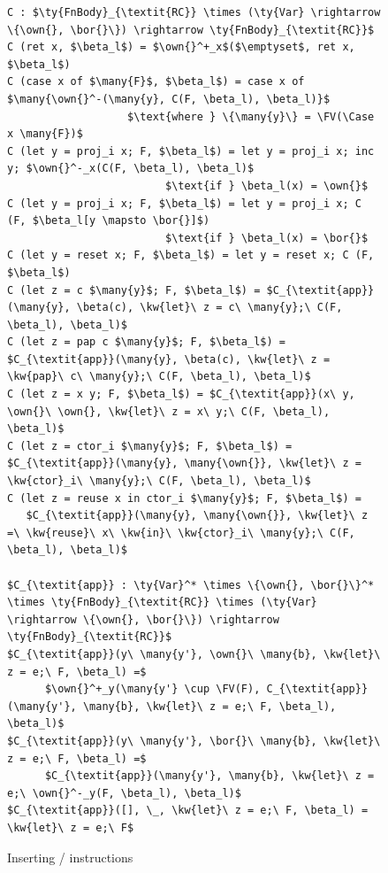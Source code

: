 \documentclass[sigconf]{acmart}
\begin{document}
\begin{figure}
\begin{lstlisting}
C : $\ty{FnBody}_{\textit{RC}} \times (\ty{Var} \rightarrow \{\own{}, \bor{}\}) \rightarrow \ty{FnBody}_{\textit{RC}}$
C (ret x, $\beta_l$) = $\own{}^+_x$($\emptyset$, ret x, $\beta_l$)
C (case x of $\many{F}$, $\beta_l$) = case x of $\many{\own{}^-(\many{y}, C(F, \beta_l), \beta_l)}$
                   $\text{where } \{\many{y}\} = \FV(\Case x \many{F})$
C (let y = proj_i x; F, $\beta_l$) = let y = proj_i x; inc y; $\own{}^-_x(C(F, \beta_l), \beta_l)$
                         $\text{if } \beta_l(x) = \own{}$
C (let y = proj_i x; F, $\beta_l$) = let y = proj_i x; C (F, $\beta_l[y \mapsto \bor{}]$)
                         $\text{if } \beta_l(x) = \bor{}$
C (let y = reset x; F, $\beta_l$) = let y = reset x; C (F, $\beta_l$)
C (let z = c $\many{y}$; F, $\beta_l$) = $C_{\textit{app}}(\many{y}, \beta(c), \kw{let}\ z = c\ \many{y};\ C(F, \beta_l), \beta_l)$
C (let z = pap c $\many{y}$; F, $\beta_l$) = $C_{\textit{app}}(\many{y}, \beta(c), \kw{let}\ z = \kw{pap}\ c\ \many{y};\ C(F, \beta_l), \beta_l)$
C (let z = x y; F, $\beta_l$) = $C_{\textit{app}}(x\ y, \own{}\ \own{}, \kw{let}\ z = x\ y;\ C(F, \beta_l), \beta_l)$
C (let z = ctor_i $\many{y}$; F, $\beta_l$) = $C_{\textit{app}}(\many{y}, \many{\own{}}, \kw{let}\ z = \kw{ctor}_i\ \many{y};\ C(F, \beta_l), \beta_l)$
C (let z = reuse x in ctor_i $\many{y}$; F, $\beta_l$) =
   $C_{\textit{app}}(\many{y}, \many{\own{}}, \kw{let}\ z =\ \kw{reuse}\ x\ \kw{in}\ \kw{ctor}_i\ \many{y};\ C(F, \beta_l), \beta_l)$

$C_{\textit{app}} : \ty{Var}^* \times \{\own{}, \bor{}\}^* \times \ty{FnBody}_{\textit{RC}} \times (\ty{Var} \rightarrow \{\own{}, \bor{}\}) \rightarrow \ty{FnBody}_{\textit{RC}}$
$C_{\textit{app}}(y\ \many{y'}, \own{}\ \many{b}, \kw{let}\ z = e;\ F, \beta_l) =$
      $\own{}^+_y(\many{y'} \cup \FV(F), C_{\textit{app}}(\many{y'}, \many{b}, \kw{let}\ z = e;\ F, \beta_l), \beta_l)$
$C_{\textit{app}}(y\ \many{y'}, \bor{}\ \many{b}, \kw{let}\ z = e;\ F, \beta_l) =$
      $C_{\textit{app}}(\many{y'}, \many{b}, \kw{let}\ z = e;\ \own{}^-_y(F, \beta_l), \beta_l)$
$C_{\textit{app}}([], \_, \kw{let}\ z = e;\ F, \beta_l) = \kw{let}\ z = e;\ F$
\end{lstlisting}
\caption{Inserting / instructions \label{fig:compiler}}
\end{figure}
\end{document}
